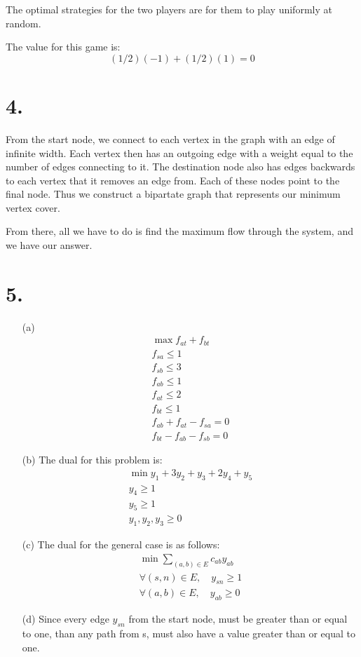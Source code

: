 \documentclass[11pt]{article}
\begin{document}
The optimal strategies for the two players are for them to play uniformly at
random. 

The value for this game is: 
\begin{equation*}
(1/2)(-1) + (1/2)(1) = 0
\end{equation*}

\newpage
\section*{4.}
From the start node, we connect to each vertex in the graph with an edge of
infinite width. Each vertex then has an outgoing edge with a weight equal to the
number of edges connecting to it. The destination node also has edges backwards
to each vertex that it removes an edge from. Each of these nodes point to the
final node. Thus we construct a bipartate graph that represents our minimum
vertex cover.

From there, all we have to do is find the maximum flow through the system, and
we have our answer. 
\newpage
\section*{5.}
\begin{enumerate}
\item[(a)]
\begin{eqnarray*}
\max f_{at} + f_{bt}\\
f_{sa} \le 1\\
f_{sb} \le 3\\
f_{ab} \le 1\\
f_{at} \le 2\\
f_{bt} \le 1\\
f_{ab} + f_{at} - f_{sa} = 0\\
f_{bt} - f_{ab} - f_{sb} = 0
\end{eqnarray*}

\item[(b)]
The dual for this problem is:
\begin{eqnarray*}
\min y_1 + 3y_2 + y_3 + 2y_4 + y_5\\
y_4 \ge 1\\
y_5 \ge 1\\
y_1,y_2,y_3 \ge 0
\end{eqnarray*}

\item[(c)]
The dual for the general case is as follows:
\begin{eqnarray*}
\min \sum_{(a,b) \in E} c_{ab}y_{ab}\\
\forall (s, n) \in E,\quad y_{sn} \ge 1\\
\forall (a, b) \in E,\quad y_{ab} \ge 0
\end{eqnarray*}

\item[(d)]
Since every edge $y_{sn}$ from the start node, must be greater than or equal to
one, than any path from s, must also have a value greater than or equal to one.
\end{enumerate}
\newpage
\end{document}
